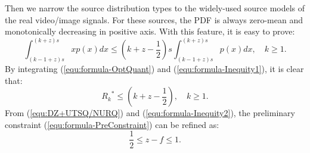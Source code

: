 \documentclass[smallabstract,smallcaptions]{dccpaper}
\begin{document}
Then we narrow the source distribution types to the widely-used source models of the real video/image signals. For these sources, the PDF is always zero-mean and monotonically decreasing in positive axis. With this feature, it is easy to prove:
\begin{equation}\label{equ:formula-Inequity1}
	\int_{(k-1+z)s}^{(k+z)s} xp(x)dx \le (k+z-\frac{1}{2}) s \int_{(k-1+z)s}^{(k+z)s} p(x)dx, \quad k \ge 1.
\end{equation}
By integrating (\ref{equ:formula-OptQuant}) and (\ref{equ:formula-Inequity1}), it is clear that:
\begin{equation}\label{equ:formula-Inequity2}
	{R_k}^* \le (k+z-\frac{1}{2}), \quad k \ge 1.
\end{equation}
From (\ref{equ:DZ+UTSQ/NURQ}) and (\ref{equ:formula-Inequity2}), the preliminary constraint (\ref{equ:formula-PreConstraint}) can be refined as:
\begin{equation}\label{equ:formula-RefConstraint}
	\frac{1}{2} \le z - f \le 1. 
\end{equation}
\end{document}

